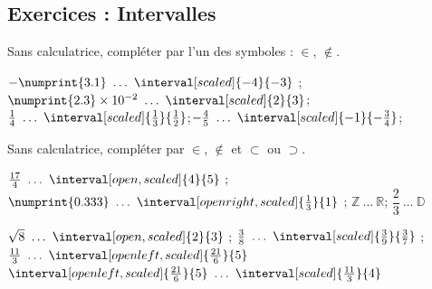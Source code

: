\documentclass[main.tex]{subfiles}
\begin{document}
\subsection{Exercices : Intervalles}
\begin{exercise} \hfill 
	
	Sans calculatrice, compléter par l'un des symboles : $\in$, $\notin$.
	
	$-\numprint{3.1}~\dots~ \interval[scaled]{-4}{-3}$ ;\hfill $\numprint{2.3}\times10^{-2} ~\dots~\interval[scaled]{2}{3}$;\hfill $\frac{1}{4} ~\dots~\interval[scaled]{\frac{1}{3}}{\frac{1}{2}}$;\hfill $-\frac{4}{5} ~\dots~\interval[scaled]{-1}{-\frac{3}{4}}$;\hfill
\end{exercise} 
\begin{exercise} \hfill 
	
	Sans calculatrice, compléter par  $\in$, $\notin$ et $\subset$ ou $\supset$.
	
	$\frac{17}{4}~\dots~ \interval[open, scaled]{4}{5}$ ;\hfill
	$\numprint{0.333}~\dots~ \interval[ open right, scaled]{\frac{1}{3}}{1}$ ;\hfill
	$\mathbb{Z}~\dots~\mathbb{R}$;\hfill 
	$\dfrac{2}{3}~\dots~  \mathbb{D}$ \hfill
	
	$\sqrt{8}~\dots~ \interval[open, scaled]{2}{3}$ ;\hfill
	$\frac{3}{8}~\dots~ \interval[ scaled]{\frac{3}{9}}{\frac{3}{7}}$ ;\hfill 
	$\frac{11}{3} ~\dots~  \interval[ open left, scaled]{\frac{21}{6}}{5}$ \hfill
	$  \interval[ open left, scaled]{\frac{21}{6}}{5} ~\dots~ \interval[ scaled]{\frac{11}{3}}{4}  $ \hfill
\end{exercise}
\end{document}
